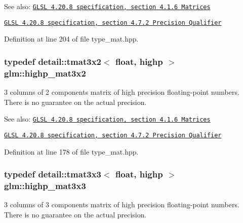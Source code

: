 \begin{Desc}
\item[See also:]\href{http://www.opengl.org/registry/doc/GLSLangSpec.4.20.8.pdf}{\tt GLSL 4.20.8 specification, section 4.1.6 Matrices} 

\href{http://www.opengl.org/registry/doc/GLSLangSpec.4.20.8.pdf}{\tt GLSL 4.20.8 specification, section 4.7.2 Precision Qualifier} \end{Desc}


Definition at line 204 of file type\_\-mat.hpp.\hypertarget{group__core__precision_gbc7767293ff69cd56717ee9d8be62963}{
\subsubsection[highp\_\-mat3x2]{\setlength{\rightskip}{0pt plus 5cm}typedef detail::tmat3x2$<$ float, highp $>$ {\bf glm::highp\_\-mat3x2}}}
\label{group__core__precision_gbc7767293ff69cd56717ee9d8be62963}


3 columns of 2 components matrix of high precision floating-point numbers. There is no guarantee on the actual precision.

\begin{Desc}
\item[See also:]\href{http://www.opengl.org/registry/doc/GLSLangSpec.4.20.8.pdf}{\tt GLSL 4.20.8 specification, section 4.1.6 Matrices} 

\href{http://www.opengl.org/registry/doc/GLSLangSpec.4.20.8.pdf}{\tt GLSL 4.20.8 specification, section 4.7.2 Precision Qualifier} \end{Desc}


Definition at line 178 of file type\_\-mat.hpp.\hypertarget{group__core__precision_g8a3703cc71cdfc8928eddf46b3763c4b}{
\subsubsection[highp\_\-mat3x3]{\setlength{\rightskip}{0pt plus 5cm}typedef detail::tmat3x3$<$ float, highp $>$ {\bf glm::highp\_\-mat3x3}}}
\label{group__core__precision_g8a3703cc71cdfc8928eddf46b3763c4b}


3 columns of 3 components matrix of high precision floating-point numbers. There is no guarantee on the actual precision.

